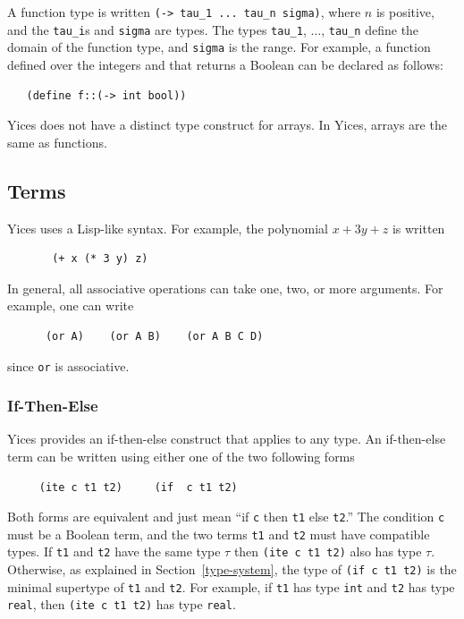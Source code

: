 \documentclass[11pt,twoside,fleqn,openright,titlepage]{cslreport}
\begin{document}
A function type is written \texttt{(-> tau\_1 ...  tau\_n
  sigma)}, where $n$ is positive, and the \texttt{tau\_i}s and
\texttt{sigma} are types.  The types \texttt{tau\_1}, $\ldots$,
\texttt{tau\_n} define the domain of the function type, and
\texttt{sigma} is the range.  For example, a function defined over
the integers and that returns a Boolean can be declared as follows:
\begin{small}
\begin{verbatim}
   (define f::(-> int bool))
\end{verbatim}
\end{small}

\medskip\noindent Yices does not  have a distinct type construct for
arrays. In Yices, arrays are the same as functions.


\subsection{Terms}

Yices uses a Lisp-like syntax. For example, the polynomial $x + 3y +
z$ is written
\begin{small}
\begin{verbatim}
       (+ x (* 3 y) z)
\end{verbatim}
\end{small}
In general, all associative operations can take one, two, or more
arguments. For example, one can write
\begin{small}
\begin{verbatim}
      (or A)    (or A B)    (or A B C D)
\end{verbatim}
\end{small}
since \texttt{or} is associative.


\subsubsection*{If-Then-Else}

Yices provides an if-then-else construct that applies to any type.  An
if-then-else term can be written using either one of the two following
forms
\begin{small}
\begin{verbatim}
     (ite c t1 t2)     (if  c t1 t2)
\end{verbatim}
\end{small}
Both forms are equivalent and just mean ``if \texttt{c} then
\texttt{t1} else \texttt{t2}.''  The condition \texttt{c} must
be a Boolean term, and the two terms \texttt{t1} and \texttt{t2}
must have compatible types. If \texttt{t1} and \texttt{t2} have
the same type $\tau$ then \texttt{(ite c t1 t2)} also has type
$\tau$.  Otherwise, as explained in Section~\ref{type-system}, the
type of \texttt{(if c t1 t2)} is the minimal supertype of
\texttt{t1} and \texttt{t2}.  For example, if \texttt{t1} has
type \texttt{int} and \texttt{t2} has type \texttt{real}, then
\texttt{(ite c t1 t2)} has type \texttt{real}.
\end{document}
